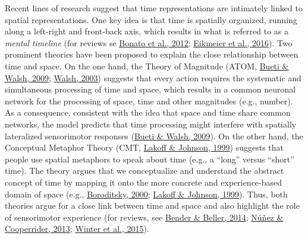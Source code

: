 \documentclass[
  a4paper,12pt,twoside,onecolumn,openright,final,oldfontcommands]{memoir}
\begin{document}
Recent lines of research suggest that time representations are intimately linked to spatial representations. One key idea is that time is spatially organized, running along a left-right and front-back axis, which results in what is referred to as a \emph{mental} \emph{timeline} (for reviews se \protect\hyperlink{ref-bonato_when_2012}{Bonato et al., 2012}; \protect\hyperlink{ref-lewandowska-tomaszczyk_mental_2016}{Eikmeier et al., 2016}). Two prominent theories have been proposed to explain the close relationship between time and space. On the one hand, the Theory of Magnitude (ATOM, \protect\hyperlink{ref-bueti_parietal_2009}{Bueti \& Walsh, 2009}; \protect\hyperlink{ref-walsh_theory_2003}{Walsh, 2003}) suggests that every action requires the systematic and simultaneous processing of time and space, which results in a common neuronal network for the processing of space, time and other magnitudes (e.g., number). As a consequence, consistent with the idea that space and time share common networks, the model predicts that time processing might interfere with spatially lateralized sensorimotor responses (\protect\hyperlink{ref-bueti_parietal_2009}{Bueti \& Walsh, 2009}). On the other hand, the Conceptual Metaphor Theory (CMT, \protect\hyperlink{ref-lakoff_philosophy_1999}{Lakoff \& Johnson, 1999}) suggests that people use spatial metaphors to speak about time (e.g., a ``long'' versus ``short'' time). The theory argues that we conceptualize and understand the abstract concept of time by mapping it onto the more concrete and experience-based domain of space (e.g., \protect\hyperlink{ref-boroditsky_metaphoric_2000}{Boroditsky, 2000}; \protect\hyperlink{ref-lakoff_philosophy_1999}{Lakoff \& Johnson, 1999}). Thus, both theories argue for a close link between time and space and also highlight the role of sensorimotor experience (for reviews, see \protect\hyperlink{ref-bender_mapping_2014}{Bender \& Beller, 2014}; \protect\hyperlink{ref-nunez_tangle_2013}{Núñez \& Cooperrider, 2013}; \protect\hyperlink{ref-winter_magnitudes_2015}{Winter et al., 2015}).
\end{document}
